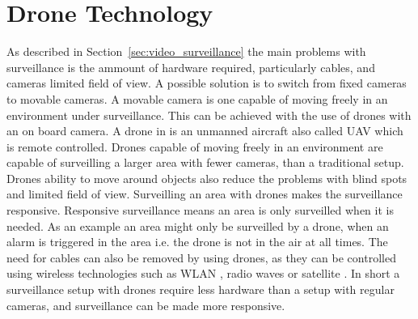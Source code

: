 \section{Drone Technology}
As described in Section~\ref{sec:video_surveillance} the main problems with surveillance is the ammount of hardware required, particularly cables, and cameras limited field of view.
A possible solution is to switch from fixed cameras to movable cameras.
A movable camera is one capable of moving freely in an environment under surveillance.
This can be achieved with the use of drones with an on board camera.
A drone in \projectname{} is an unmanned aircraft also called UAV which is remote controlled.
Drones capable of moving freely in an environment are capable of surveilling a larger area with fewer cameras, than a traditional setup.
Drones ability to move around objects also reduce the problems with blind spots and limited field of view.
Surveilling an area with drones makes the surveillance responsive.
Responsive surveillance means an area is only surveilled when it is needed.
As an example an area might only be surveilled by a drone, when an alarm is triggered in the area i.e. the drone is not in the air at all times.
The need for cables can also be removed by using drones, as they can be controlled using wireless technologies such as WLAN \citep{ardrone_developer_guide}, radio waves or satellite \citep{drone_freq}.
In short a surveillance setup with drones require less hardware than a setup with regular cameras, and surveillance can be made more responsive.